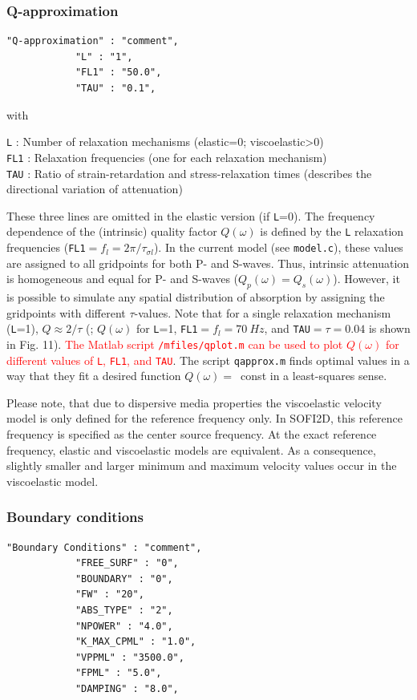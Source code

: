\subsubsection{Q-approximation}
\label{Q-approximation}
\begin{verbatim}
"Q-approximation" : "comment",
            "L" : "1",
            "FL1" : "50.0", 
            "TAU" : "0.1",
\end{verbatim}

with 

\texttt{L} : Number of relaxation mechanisms (elastic=0; viscoelastic>0)\\
\texttt{FL1} : Relaxation frequencies (one for each relaxation mechanism)\\
\texttt{TAU} : Ratio of strain-retardation and stress-relaxation times (describes the directional variation of attenuation)

These three lines are omitted in the elastic version (if \texttt{L}=0). The frequency dependence of the (intrinsic) quality factor $Q(\omega)$ is defined by the \texttt{L} relaxation frequencies (\texttt{FL1}$=f_l=2\pi/\tau_{\sigma l}$). In the current model (see \texttt{model.c}), these values are assigned to all gridpoints for both P- and S-waves. Thus, intrinsic attenuation is homogeneous and equal for P- and S-waves ($Q_p(\omega)=Q_s(\omega)$). However, it is possible to simulate any spatial distribution of absorption by assigning the gridpoints with different $\tau$-values. Note that for a single relaxation mechanism (\texttt{L}=1), $Q \approx 2/\tau$ (\cite{bohlen:02}; $Q(\omega)$ for \texttt{L}=1, \texttt{FL1}$ =f_l=\SI{70}{Hz}$, and \texttt{TAU}$=\tau=0.04$ is shown in Fig. 11). \textcolor{red}{The Matlab script \texttt{/mfiles/qplot.m} can be used to plot $Q(\omega)$ for different values of \texttt{L}, \texttt{FL1}, and \texttt{TAU}}. The script \texttt{qapprox.m} finds optimal values in a way that they fit a desired function $Q(\omega)=$~const in a least-squares sense.

Please note, that due to dispersive media properties the viscoelastic velocity model is only defined for the reference frequency only. In SOFI2D, this reference frequency is specified as the center source frequency. At the exact reference frequency, elastic and viscoelastic models are equivalent. As a consequence, slightly smaller and larger minimum and maximum velocity values occur in the viscoelastic model.

\subsubsection{Boundary conditions}
\label{abs}
\begin{verbatim}
"Boundary Conditions" : "comment",
            "FREE_SURF" : "0",
            "BOUNDARY" : "0",
            "FW" : "20",
            "ABS_TYPE" : "2",
            "NPOWER" : "4.0",
            "K_MAX_CPML" : "1.0",
            "VPPML" : "3500.0",
            "FPML" : "5.0",
            "DAMPING" : "8.0",
\end{verbatim}

